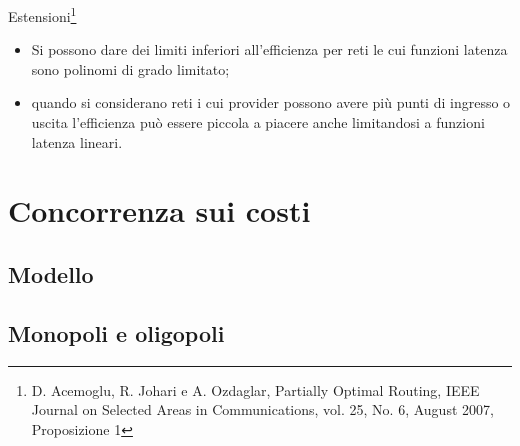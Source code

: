 \documentclass{beamer}
\theoremstyle{plain}
\theoremstyle{definition}
\theoremstyle{remark}
\begin{document}
\begin{frame}{Estensioni\footnote{D. Acemoglu, R. Johari e
      A. Ozdaglar, Partially Optimal Routing, IEEE Journal on Selected
      Areas in Communications, vol. 25, No. 6, August 2007,
      Proposizione 1}}
  \begin{itemize}
  \item Si possono dare dei limiti inferiori all'efficienza per reti
    le cui funzioni latenza sono polinomi di grado limitato;
  \item quando si considerano reti i cui provider possono avere più
    punti di ingresso o uscita l'efficienza può essere piccola a
    piacere anche limitandosi a funzioni latenza lineari.
  \end{itemize}
\end{frame}

\section{Concorrenza sui costi}

\subsection{Modello}

\subsection{Monopoli e oligopoli}
\end{document}
